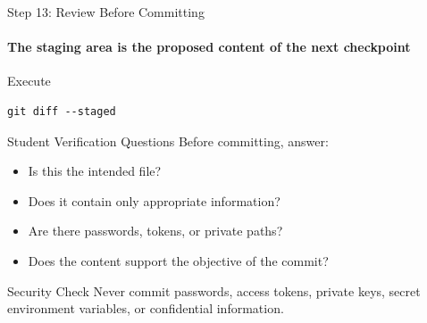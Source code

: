 \begin{frame}[fragile]{Step 13: Review Before Committing}
\framesubtitle{The staging area is the proposed content of the next checkpoint}

\footnotesize

\begin{block}{Execute}
\begin{verbatim}
git diff --staged
\end{verbatim}
\end{block}

\begin{exampleblock}{Student Verification Questions}
Before committing, answer:

\begin{itemize}
    \setlength{\itemsep}{0.18em}
    \item Is this the intended file?
    \item Does it contain only appropriate information?
    \item Are there passwords, tokens, or private paths?
    \item Does the content support the objective of the commit?
\end{itemize}
\end{exampleblock}

\begin{alertblock}{Security Check}
Never commit passwords, access tokens, private keys, secret environment
variables, or confidential information.
\end{alertblock}

\end{frame}

